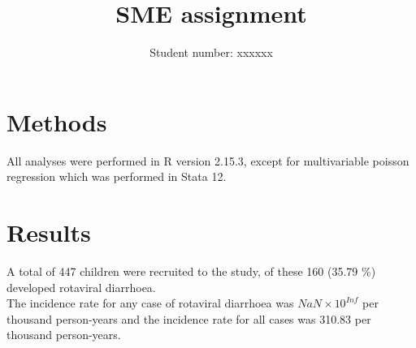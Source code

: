 \documentclass[11pt,a4paper,twoside]{article}\usepackage{graphicx, color}
\title{SME assignment}
\author{Student number: xxxxxx}
\begin{document}
\section{Methods}


All analyses were performed in R version 2.15.3, except for multivariable poisson regression which was performed in Stata 12.\\
\section{Results}
A total of 447 children were recruited to the study, of these 160 (35.79 \%) developed rotaviral diarrhoea. \\
The incidence rate for any case of rotaviral diarrhoea was \ensuremath{NaN\times 10^{Inf}} per thousand person-years and the incidence rate for all cases was 310.83 per thousand person-years.\\ 
\end{document}
